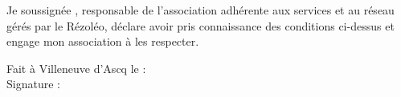 \documentclass[11pt]{article}
\begin{document}
\vspace*{0.5cm}

Je soussignée \makebox[50mm]{\dotfill}, responsable de l'association \makebox[50mm]{\dotfill} adhérente aux services et au réseau gérés par le Rézoléo,
déclare avoir pris connaissance des conditions ci-dessus et engage mon association à les respecter.

\vspace*{0.5cm}


\begin{flushright}
	\begin{minipage}{0.5\linewidth}
		Fait à Villeneuve d'Ascq le : \dotfill\\
		Signature :
	\end{minipage}
\end{flushright}
\end{document}
